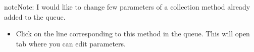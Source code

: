 \documentclass[a4paper,10pt,english]{sphinxmanual}
\begin{document}
\begin{notice}{note}{Note:}
I would like to change few parameters of a collection method already added to the queue.
\end{notice}
\begin{itemize}
\item {} 
Click on the line corresponding to this method in the queue. This will open tab where you can edit parameters.

\end{itemize}



\renewcommand{\indexname}{Index}
\printindex
\end{document}
